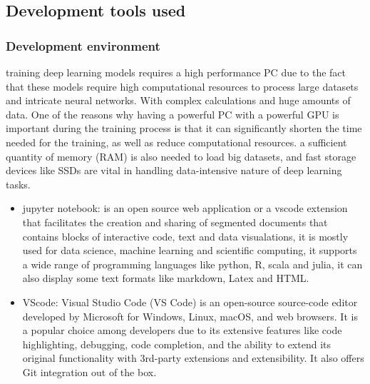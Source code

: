\subsection{Development tools used}
\subsubsection{Development environment}
training deep learning models requires a high performance PC due to the fact that these models require high computational resources to process large datasets and intricate neural networks.  With complex calculations and huge amounts of data. One of the reasons why having a powerful PC with a powerful GPU is important during the training process is that it can significantly shorten the time needed for the training, as well as reduce computational resources. a sufficient quantity of memory (RAM) is also needed to load big datasets, and fast storage devices like SSDs are vital in handling data-intensive nature of deep learning tasks.





\begin{itemize}
	\item jupyter notebook: is an open source web application or a vscode extension that facilitates the creation and sharing of segmented documents that contains blocks of interactive code, text and data visualations, it is mostly used for data science, machine learning and scientific computing, it supports a wide range of programming languages like python, R, scala and julia, it can also display some text formats like markdown, Latex and HTML.
	\item VScode: Visual Studio Code (VS Code) is an open-source source-code editor developed by Microsoft for Windows, Linux, macOS, and web browsers. It is a popular choice among developers due to its extensive features like code highlighting, debugging, code completion, and the ability to extend its original functionality with 3rd-party extensions and extensibility. It also offers Git integration out of the box.
\end{itemize}





